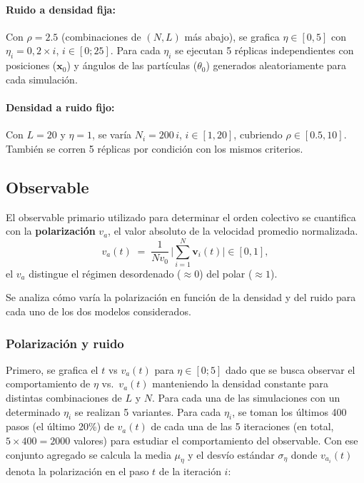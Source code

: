 \documentclass{article}
\begin{document}
\paragraph{Ruido a densidad fija:} Con \(\rho=2.5\) (combinaciones de \((N,L)\) más abajo), se grafica \(\eta\in[0,5]\) con \(\eta_i=0,2\times i\), \(i\in[0;25]\). Para cada \(\eta_i\) se ejecutan 5 réplicas independientes con posiciones (\(\mathbf x_0\)) y ángulos de las partículas (\( \theta_0\)) generados aleatoriamente para cada simulación.

\paragraph{Densidad a ruido fijo:} Con \(L=20\) y \(\eta=1\), se varía \(N_i=200\,i\), \(i \in [1,20]\), cubriendo \(\rho\in[0.5,10]\). También se corren 5 réplicas por condición con los mismos criterios.


\subsection{Observable}
El observable primario utilizado para determinar el orden colectivo se cuantifica con la \textbf{polarización} \(v_a\), el valor absoluto de la velocidad promedio normalizada.
\[
v_a(t) \;=\; \frac{1}{N v_0}\,\Big|\sum_{i=1}^N \mathbf v_i(t)\Big|\in[0,1],
\]
el \(v_a\) distingue el régimen desordenado (\(\approx 0\)) del polar (\(\approx 1\)).

Se analiza cómo varía la polarización en función de la densidad y del ruido para cada uno de los dos modelos considerados.

\subsubsection{Polarización y ruido}
Primero, se grafica el \(t\) vs \(v_a(t)\) para \(\eta \in [0;5]\) dado que se busca observar el comportamiento de \( \eta \) vs.\ \( v_a(t) \) manteniendo la densidad constante para distintas combinaciones de \( L \) y \( N \).  Para cada una de las simulaciones con un determinado \(\eta_i\) se realizan 5 variantes. Para cada \(\eta_i\), se toman los últimos 400 pasos (el último 20\%) de \(v_a(t)\) de cada una de las 5 iteraciones (en total, \(5\times 400=2000\) valores) para estudiar el comportamiento del observable. Con ese conjunto agregado se calcula la media \(\mu_\eta\) y el desvío estándar \(\sigma_\eta\) donde \(v_{a_i}(t)\) denota la polarización en el paso \(t\) de la iteración \(i\):
\end{document}
